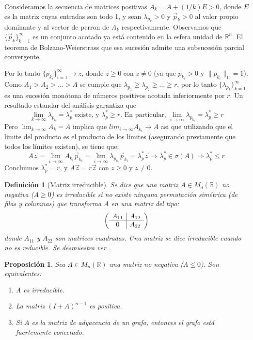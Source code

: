 \documentclass[size=a4, parskip=half, titlepage=false, toc=flat, toc=bib, 12pt]{scrartcl}
\makeatletter
\renewenvironment{proof}[1][\proofname] {\par\pushQED{\qed}\normalfont\topsep6\p@\@plus6\p@\relax\trivlist\item[\hskip\labelsep\itshape\tgpaella#1\@addpunct{.}]\ignorespaces}{\popQED\endtrivlist\@endpefalse}
\theoremstyle{theorem-style}
\newtheorem{nprop}{Proposición}[section]
\theoremstyle{definition-style}
\newtheorem{ndef}{Definición}[section]
\theoremstyle{remark-style}
\theoremstyle{example-style}
\theoremstyle{definition-style}
\theoremstyle{remark-style}
\makeatother
\begin{document}
\begin{proof}
Consideramos la secuencia de matrices positivas $A_k = A + (1/k)E > 0$, donde $E$ es la matriz cuyas entradas son todo 1, y sean $\lambda_{p_k} >0$ y $\vec{p}_k >0$ al valor propio dominante y al vector de perron de $A_k$ respectivamente. Observamos que $\{\vec{p}_k\}_{k=1}^{\infty}$ es un conjunto acotado ya está contenido en la esfera unidad de $\mathbb{R}^n$. El teorema de Bolzano-Weierstrass que esa sucesión admite una subsucesión parcial convergente.

Por lo tanto $\{p_{k_i}\}_{i = 1}^{\infty} \rightarrow z$, donde $z \geq 0$ con $z \neq 0$ (ya que $p_{k_i} > 0$ y $\|p_{k_i} \|_1 = 1$). Como $A_1 > A_2 > \dots > A$ se cumple que $\lambda_{p_1} \geq \lambda_{p_2} \geq \dots \geq r $, por lo tanto $\{\lambda_{p_k}\}_{k = 1}^{\infty}$ es una sucesión monótona de números positivos acotada inferiormente por $r$. Un resultado estandar del análisis garantiza que
$$\lim_{k \to \infty} \lambda_{p_k} = \lambda_p^* \textrm{ existe, y } \lambda_p^* \geq r \textrm{. En particular, } \lim_{i \to \infty} \lambda_{p_{k_i}} = \lambda_p^* \geq r$$
Pero $\lim_{k \to \infty} A_k = A$ implica que $lim_{i \to \infty} A_{k_i} \rightarrow A$ asi que utilizando que el limite del producto es el producto de los límites (asegurando previamente que todos los límites existen), se tiene que:
$$A \vec{z} = \lim_{i \to \infty} A_{k_i} \vec{p}_k_i = \lim_{i \to \infty} \lambda_{p_{k_i}} \vec{p}_{k_i} = \lambda_p^* \vec{z}  \Rightarrow \lambda_p^* \in \sigma(A) \Rightarrow \lambda_p^* \leq r$$
Concluimos $\lambda_p^* = r$, y $A \vec{z} = r \vec{z}$ con $z \geq 0$ y $z \neq 0$.
\end{proof}

\begin{ndef}[Matriz irreducible]
Se dice que una matriz $A \in M_d(\mathbb{R})$ no negativa ($A \geq 0$) es irreducible si no existe ninguna permutación simétrica (de filas y columnas) que transforma $A$ en una matriz del tipo:
$$\left(
      \begin{array}{{c|c}}
            A_{11}    &    A_{12}  \\\hline
            0         &    A_{22}     \\
      \end{array}   \right)$$
donde $A_{11}$ y $A_{22}$ son matrices cuadradas. Una matriz se dice irreducible cuando no es reducible. Se desmuestra ver \cite{algebralineal}.
\end{ndef}

\begin{nprop}
\label{irreducible}
\label{positiva}
Sea $A \in M_n(\mathbb{R})$ una matriz no negativa ($A \leq 0$). Son equivalentes:
\begin{enumerate}
\item A es irreducible.
\item La matriz $(I + A)^{n - 1}$ es positiva.
\item Si $A$ es la matriz de adyacencia de un grafo, entonces el grafo está fuertemente conectado.
\end{enumerate}
\end{nprop}
\end{document}
